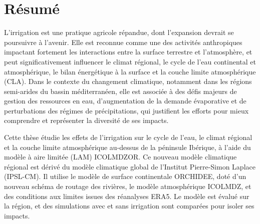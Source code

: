 \documentclass{report}
\begin{document}
\clearpage

\section*{Résumé}

L'irrigation est une pratique agricole répandue, dont l'expansion devrait se poursuivre à l'avenir. Elle est reconnue comme une des activités anthropiques impactant fortement les interactions entre la surface terrestre et l'atmosphère, et peut significativement influencer le climat régional, le cycle de l'eau continental et atmosphérique, le bilan énergétique à la surface et la couche limite atmosphérique (CLA).
Dans le contexte du changement climatique, notamment dans les régions semi-arides du bassin méditerranéen, elle est associée à des défis majeurs de gestion des ressources en eau, d'augmentation de la demande évaporative et de perturbations des régimes de précipitations, qui justifient les efforts pour mieux comprendre et représenter la diversité de ses impacts.

Cette thèse étudie les effets de l'irrigation sur le cycle de l'eau, le climat régional et la couche limite atmosphérique au-dessus de la péninsule Ibérique, à l'aide du modèle à aire limitée (LAM) ICOLMDZOR. Ce nouveau modèle climatique régional est dérivé du modèle climatique global de l'Institut Pierre-Simon Laplace (IPSL-CM). Il utilise le modèle de surface continentale ORCHIDEE, doté d'un nouveau schéma de routage des rivières, le modèle atmosphérique ICOLMDZ, et des conditions aux limites issues des réanalyses ERA5.
Le modèle est évalué sur la région, et des simulations avec et sans irrigation sont comparées pour isoler ses impacts.
\end{document}
